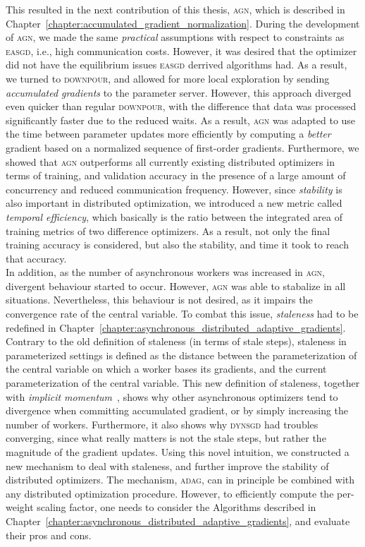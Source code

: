This resulted in the next contribution of this thesis, \textsc{agn}, which is described in Chapter~\ref{chapter:accumulated_gradient_normalization}. During the development of \textsc{agn}, we made the same \emph{practical} assumptions with respect to constraints as \textsc{easgd}, i.e., high communication costs. However, it was desired that the optimizer did not have the equilibrium issues \textsc{easgd} derrived algorithms had. As a result, we turned to \textsc{downpour}, and allowed for more local exploration by sending \emph{accumulated gradients} to the parameter server. However, this approach diverged even quicker than regular \textsc{downpour}, with the difference that data was processed significantly faster due to the reduced waits. As a result, \textsc{agn} was adapted to use the time between parameter updates more efficiently by computing a \emph{better} gradient based on a normalized sequence of first-order gradients. Furthermore, we showed that \textsc{agn} outperforms all currently existing distributed optimizers in terms of training, and validation accuracy in the presence of a large amount of concurrency and reduced communication frequency. However, since \emph{stability} is also important in distributed optimization, we introduced a new metric called \emph{temporal efficiency}, which basically is the ratio between the integrated area of training metrics of two difference optimizers. As a result, not only the final training accuracy is considered, but also the stability, and time it took to reach that accuracy.\\

In addition, as the number of asynchronous workers was increased in \textsc{agn}, divergent behaviour started to occur. However, \textsc{agn} was able to stabalize in all situations. Nevertheless, this behaviour is not desired, as it impairs the convergence rate of the central variable. To combat this issue, \emph{staleness} had to be redefined in Chapter~\ref{chapter:asynchronous_distributed_adaptive_gradients}. Contrary to the old definition of staleness (in terms of stale steps), staleness in parameterized settings is defined as the distance between the parameterization of the central variable on which a worker bases its gradients, and the current parameterization of the central variable. This new definition of staleness, together with \emph{implicit momentum}~\cite{implicitmomentum}, shows why other asynchronous optimizers tend to divergence when committing accumulated gradient, or by simply increasing the number of workers. Furthermore, it also shows why \textsc{dynsgd} had troubles converging, since what really matters is not the stale steps, but rather the magnitude of the gradient updates. Using this novel intuition, we constructed a new mechanism to deal with staleness, and further improve the stability of distributed optimizers. The mechanism, \textsc{adag}, can in principle be combined with any distributed optimization procedure. However, to efficiently compute the per-weight scaling factor, one needs to consider the Algorithms described in Chapter~\ref{chapter:asynchronous_distributed_adaptive_gradients}, and evaluate their pros and cons.\\

